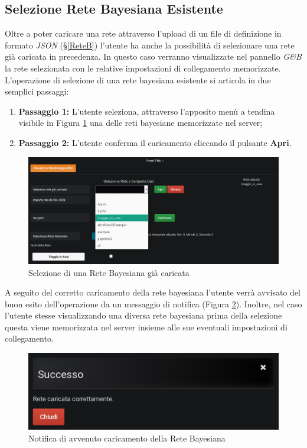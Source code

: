 \subsection{Selezione Rete Bayesiana Esistente}\label{SelezioneRete}

Oltre a poter caricare una rete attraverso l'upload di un file di definizione in formato \textit{JSON} (§\ref{ReteB}) l'utente ha anche la possibilità di selezionare una rete già caricata in precedenza. In questo caso verranno visualizzate nel pannello \textit{G\&B} la rete selezionata con le relative impostazioni di collegamento memorizzate.\\
L'operazione di selezione di una rete bayesiana esistente si articola in due semplici passaggi:
\begin{enumerate}
	\item \textbf{Passaggio 1:} L'utente seleziona, attraverso l'apposito menù a tendina visibile in Figura \ref{SelezioneReteImg} una delle reti bayesiane memorizzate nel server;
	\item \textbf{Passaggio 2:} L'utente conferma il caricamento cliccando il pulsante \textbf{Apri}.
\end{enumerate}

\begin{figure}[H]
	\begin{center}
		\includegraphics[scale=0.4]{./images/SelezioneRete.png}
		 \caption{Selezione di una Rete Bayesiana già caricata}	
		 \label{SelezioneReteImg}
	\end{center}
\end{figure}

A seguito del corretto caricamento della rete bayesiana l'utente verrà avvisato del buon esito dell'operazione da un messaggio di notifica (Figura \ref{NotificaSelezioneRete}). Inoltre, nel caso l'utente stesse visualizzando una diversa rete bayesiana prima della selezione questa viene memorizzata nel server insieme alle sue eventuali impostazioni di collegamento.

\begin{figure}[H]
	\begin{center}
		\includegraphics[scale=0.6]{./images/NotificaSelezioneRete.png}
		 \caption{Notifica di avvenuto caricamento della Rete Bayesiana}	
		 \label{NotificaSelezioneRete}
	\end{center}
\end{figure}



